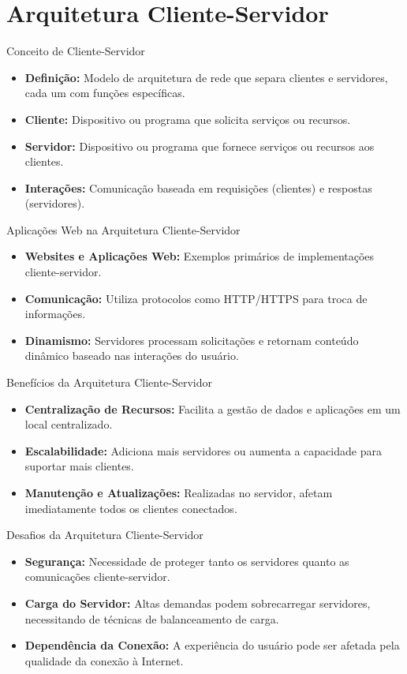 \section{Arquitetura Cliente-Servidor}
\begin{frame}{Conceito de Cliente-Servidor}
  \begin{itemize}
    \item \textbf{Definição:} Modelo de arquitetura de rede que separa clientes e servidores, cada um com funções específicas.
    \item \textbf{Cliente:} Dispositivo ou programa que solicita serviços ou recursos.
    \item \textbf{Servidor:} Dispositivo ou programa que fornece serviços ou recursos aos clientes.
    \item \textbf{Interações:} Comunicação baseada em requisições (clientes) e respostas (servidores).
  \end{itemize}
\end{frame}

\begin{frame}{Aplicações Web na Arquitetura Cliente-Servidor}
  \begin{itemize}
    \item \textbf{Websites e Aplicações Web:} Exemplos primários de implementações cliente-servidor.
    \item \textbf{Comunicação:} Utiliza protocolos como HTTP/HTTPS para troca de informações.
    \item \textbf{Dinamismo:} Servidores processam solicitações e retornam conteúdo dinâmico baseado nas interações do usuário.
  \end{itemize}
\end{frame}

\begin{frame}{Benefícios da Arquitetura Cliente-Servidor}
  \begin{itemize}
    \item \textbf{Centralização de Recursos:} Facilita a gestão de dados e aplicações em um local centralizado.
    \item \textbf{Escalabilidade:} Adiciona mais servidores ou aumenta a capacidade para suportar mais clientes.
    \item \textbf{Manutenção e Atualizações:} Realizadas no servidor, afetam imediatamente todos os clientes conectados.
  \end{itemize}
\end{frame}

\begin{frame}{Desafios da Arquitetura Cliente-Servidor}
  \begin{itemize}
    \item \textbf{Segurança:} Necessidade de proteger tanto os servidores quanto as comunicações cliente-servidor.
    \item \textbf{Carga do Servidor:} Altas demandas podem sobrecarregar servidores, necessitando de técnicas de balanceamento de carga.
    \item \textbf{Dependência da Conexão:} A experiência do usuário pode ser afetada pela qualidade da conexão à Internet.
  \end{itemize}
\end{frame}

